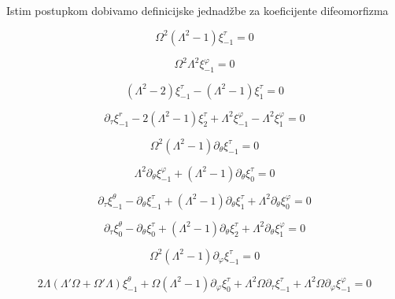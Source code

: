 \noindent Istim postupkom dobivamo definicijske jednadžbe za koeficijente difeomorfizma

{\setlength{\belowdisplayskip}{0pt} \setlength{\belowdisplayshortskip}{0pt}
\setlength{\abovedisplayskip}{0pt} \setlength{\abovedisplayshortskip}{0pt}

\begin{equation}
\Omega^2(\Lambda^2-1)\xi^\tau_{-1}=0
\end{equation}

\begin{equation}
\Omega^2\Lambda^2\xi^\varphi_{-1}=0
\end{equation}

\begin{equation}
(\Lambda^2-2)\xi^\tau_{-1}-(\Lambda^2-1)\xi^\tau_{1}=0
\end{equation}

\begin{equation}
\partial_\tau\xi^r_{-1}-2(\Lambda^2-1)\xi^\tau_{2}+\Lambda^2\xi^\varphi_{-1}-\Lambda^2\xi^\varphi_{1}=0
\end{equation}

\begin{equation}
\Omega^2(\Lambda^2-1)\partial_\theta\xi^\tau_{-1}=0
\end{equation}

\begin{equation}
\Lambda^2\partial_\theta\xi^\varphi_{-1}+(\Lambda^2-1)\partial_\theta\xi^\tau_{0}=0
\end{equation}

\begin{equation}
\partial_\tau\xi^\theta_{-1}-\partial_\theta\xi^\tau_{-1}+(\Lambda^2-1)\partial_\theta\xi^\tau_{1}+\Lambda^2\partial_\theta\xi^\varphi_0=0
\end{equation}

\begin{equation}
\partial_\tau\xi^\theta_{0}-\partial_\theta\xi^\tau_{0}+(\Lambda^2-1)\partial_\theta\xi^\tau_{2}+\Lambda^2\partial_\theta\xi^\varphi_1=0
\end{equation}

\begin{equation}
\Omega^2(\Lambda^2-1)\partial_\varphi\xi^\tau_{-1}=0
\end{equation}

\begin{equation}
2\Lambda(\Lambda'\Omega+\Omega'\Lambda)\xi^\theta_{-1}+\Omega(\Lambda^2-1)\partial_\varphi\xi^\tau_0+\Lambda^2\Omega\partial_\tau\xi^\tau_{-1}+\Lambda^2\Omega\partial_\varphi\xi^\varphi_{-1}=0
\end{equation}

}
